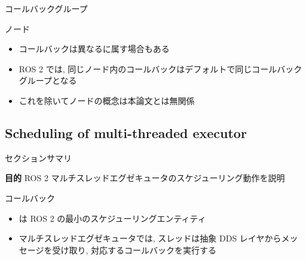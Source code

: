\begin{frame}{コールバックグループ}

\end{frame}

\begin{frame}{ノード}
    \begin{itemize}
        \item コールバックは異なるに属す場合もある
        \item ROS 2 では, 同じノード内のコールバックはデフォルトで同じコールバックグループとなる
        \item これを除いてノードの概念は本論文とは無関係
    \end{itemize}

\end{frame}


\subsection{Scheduling of multi-threaded executor}
\label{ssec: scheduling_of_multi_threaded_executor}

\begin{frame}{セクションサマリ}
\begin{itembox}[l]{\textbf{目的}}
    ROS 2 マルチスレッドエグゼキュータのスケジューリング動作を説明
\end{itembox}
\end{frame}

\begin{frame}{コールバック}
    \begin{itemize}
        \item {}は ROS 2 の最小のスケジューリングエンティティ
        \item マルチスレッドエグゼキュータでは, スレッドは抽象 DDS レイヤからメッセージを受け取り, 対応するコールバックを実行する
    \end{itemize}
\end{frame}

